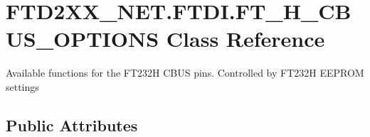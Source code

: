 \hypertarget{class_f_t_d2_x_x___n_e_t_1_1_f_t_d_i_1_1_f_t__232_h___c_b_u_s___o_p_t_i_o_n_s}{}\section{F\+T\+D2\+X\+X\+\_\+\+N\+E\+T.\+F\+T\+D\+I.\+F\+T\+\_\+H\+\_\+\+C\+B\+U\+S\+\_\+\+O\+P\+T\+I\+O\+NS Class Reference}
\label{class_f_t_d2_x_x___n_e_t_1_1_f_t_d_i_1_1_f_t__232_h___c_b_u_s___o_p_t_i_o_n_s}


Available functions for the F\+T232H C\+B\+US pins. Controlled by F\+T232H E\+E\+P\+R\+OM settings  


\subsection*{Public Attributes}
